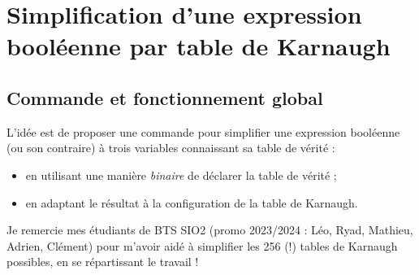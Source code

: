 \documentclass[french,a4paper,11pt]{article}
\begin{document}
{{\begin{DemoCode}[]
\begin{TableKarnaugh}
	[Variables=k/l/m,Unite=1.25cm,Couleur=darkgray, PosVarLaterale=Droite,CouleurLegende=black/blue/red,
	StyleAlternatif]
\end{TableKarnaugh}
\hspace{5mm}
\begin{TableKarnaugh}
	[Variables=k/l/m,Unite=1.25cm,CouleurCases=cyan!25,Couleur=darkgray, PosVarLaterale=Droite,CouleurLegende=black/blue/red,
	PoliceTT]
\end{TableKarnaugh}
\end{DemoCode}

\pagebreak

\section{Simplification d'une expression booléenne par table de Karnaugh}

\subsection{Commande et fonctionnement global}

\begin{cautionblock}
L'idée est de proposer une commande pour simplifier une expression booléenne (ou son contraire) à trois variables connaissant sa table de vérité :

\begin{itemize}
	\item en utilisant une manière \textit{binaire} de déclarer la table de vérité ;
	\item en adaptant le résultat à la configuration de la table de Karnaugh.
\end{itemize}
\vspace*{-\baselineskip}\leavevmode
\end{cautionblock}

\begin{importantblock}
Je remercie mes étudiants de BTS SIO2 (promo 2023/2024 : Léo, Ryad, Mathieu, Adrien, Clément) pour m'avoir aidé à simplifier les 256 (!) tables de Karnaugh possibles, en se répartissant le travail !


\end{importantblock}}}
\end{document}
